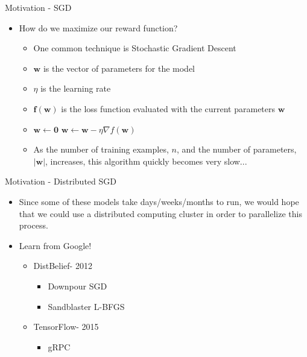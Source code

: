 \documentclass{beamer}
\begin{document}
\begin{frame}{Motivation - SGD}
\begin{itemize}
\item How do we maximize our reward function?
\begin{itemize}
\item One common technique is Stochastic Gradient Descent
\item $\mathbf w$ is the vector of parameters for the model
\item $\eta$ is the learning rate 
\item $\mathbf f(\mathbf w)$ is the loss function evaluated with the current parameters $\mathbf w$
\item 
\begin{algorithmic}
\State $\mathbf w \gets \mathbf 0$
    \State $\mathbf w \gets \mathbf w - \eta\nabla f(\mathbf w)$
	\EndFor
\EndWhile

\end{algorithmic}
\item As the number of training examples, $n$, and the number of parameters, $|\mathbf w|$, increases, this algorithm quickly becomes very slow...
\end{itemize}
\end{itemize}
\end{frame}

\begin{frame}{Motivation - Distributed SGD}
\begin{itemize}
\item Since some of these models take days/weeks/months to run, we would hope that we could use a distributed computing cluster in order to parallelize this process.
\pause
\item Learn from Google!
\begin{itemize}
\item DistBelief- 2012
\begin{itemize}
\item Downpour SGD
\item Sandblaster L-BFGS
\end{itemize}
\item TensorFlow- 2015
\begin{itemize}
\item gRPC
\end{itemize}
\end{itemize}
\end{itemize}

\end{frame}
\end{document}
